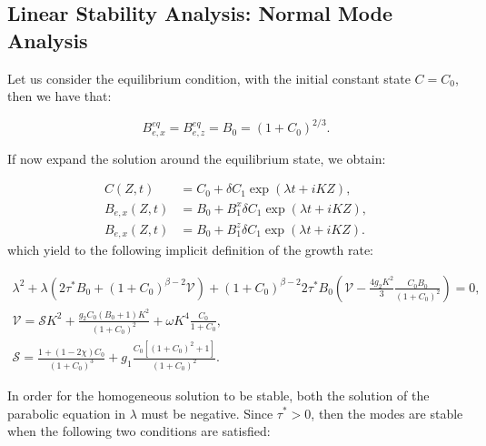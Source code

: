 \documentclass[12pt]{extarticle}
\begin{document}
\subsection{Linear Stability Analysis: Normal Mode Analysis}
\label{linear}
Let us consider the equilibrium condition, with the initial constant state $C=C_0$, then we have that:

\begin{equation}
B^{eq}_{e,x}=B^{eq}_{e,z} = B_0=(1+C_0)^{2/3}.
\end{equation} 

If now expand the solution around the equilibrium state, we obtain:

\begin{equation}
\begin{aligned}
C(Z,t) &= C_0 +\delta C_1 \exp\left(\lambda t+ i K Z\right),\\
B_{e,x}(Z,t)  &= B_0 + B^x_1 \delta C_1 \exp\left(\lambda t+ i K Z\right),\\
B_{e,x}(Z,t)  &= B_0 + B^z_1 \delta C_1\exp\left(\lambda t+ i K Z\right).
\end{aligned}
\end{equation}
which yield to the following implicit definition of the growth rate:

\begin{gather*}
\lambda^2+\lambda\left(2\tau^*B_0+(1+C_0)^{\beta-2}\mathcal{V}\right)+(1+C_0)^{\beta-2}2\tau^*B_0\left(\mathcal{V}-\frac{4g_2K^2}{3}\frac{C_0B_0}{(1+C_0)^2}\right)=0,\\
\mathcal{V}= \mathcal{S}K^2+\frac{g_2 C_0(B_0+1)K^2}{(1+C_0)^2}+\omega K^4\frac{C_0}{1+C_0},\\[2mm]
\mathcal{S}=\frac{1+(1-2\chi)C_0}{(1+C_0)^3}+g_1 \frac{C_0\left[(1+C_0)^2+1\right]}{(1+C_0)^2}.
\end{gather*}

In order for the homogeneous solution to be stable, both the solution of the parabolic equation in $\lambda$ must be negative. Since $\tau^*>0$, then the modes are stable when the following two conditions are satisfied:
\end{document}
